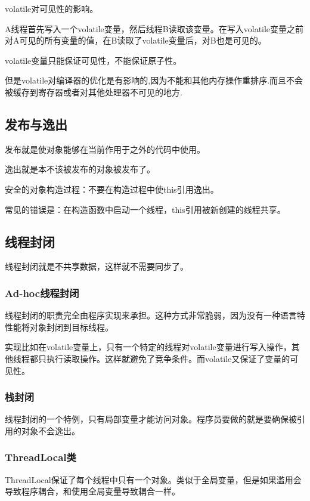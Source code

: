 volatile对可见性的影响。

A线程首先写入一个volatile变量，然后线程B读取该变量。在写入volatile变量之前对A可见的所有变量的值，在B读取了volatile变量后，对B也是可见的。


volatile变量只能保证可见性，不能保证原子性。

但是volatile对编译器的优化是有影响的,因为不能和其他内存操作重排序.而且不会被缓存到寄存器或者对其他处理器不可见的地方.



\subsection{发布与逸出}

发布就是使对象能够在当前作用于之外的代码中使用。

逸出就是本不该被发布的对象被发布了。

安全的对象构造过程：不要在构造过程中使this引用逸出。

常见的错误是：在构造函数中启动一个线程，this引用被新创建的线程共享。

\subsection{线程封闭}

线程封闭就是不共享数据，这样就不需要同步了。

\subsubsection{Ad-hoc线程封闭}

线程封闭的职责完全由程序实现来承担。这种方式非常脆弱，因为没有一种语言特性能将对象封闭到目标线程。

实现比如在volatile变量上，只有一个特定的线程对volatile变量进行写入操作，其他线程都只执行读取操作。这样就避免了竞争条件。而volatile又保证了变量的可见性。

\subsubsection{栈封闭}

线程封闭的一个特例，只有局部变量才能访问对象。程序员要做的就是要确保被引用的对象不会逸出。

\subsubsection{ThreadLocal类}

ThreadLocal保证了每个线程中只有一个对象。类似于全局变量，但是如果滥用会导致程序耦合，和使用全局变量导致耦合一样。


